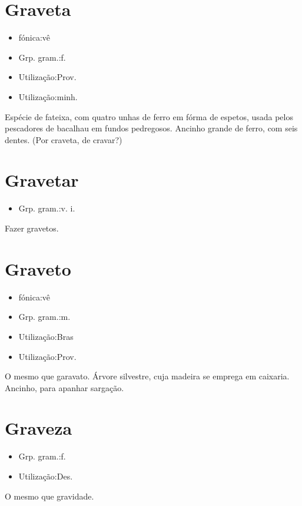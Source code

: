 \section{Graveta}
\begin{itemize}
\item {fónica:vê}
\end{itemize}
\begin{itemize}
\item {Grp. gram.:f.}
\end{itemize}
\begin{itemize}
\item {Utilização:Prov.}
\end{itemize}
\begin{itemize}
\item {Utilização:minh.}
\end{itemize}
Espécie de fateixa, com quatro unhas de ferro em fórma de espetos, usada pelos pescadores de bacalhau em fundos pedregosos.
Ancinho grande de ferro, com seis dentes.
(Por \textunderscore craveta\textunderscore , de \textunderscore cravar\textunderscore ?)
\section{Gravetar}
\begin{itemize}
\item {Grp. gram.:v. i.}
\end{itemize}
Fazer gravetos.
\section{Graveto}
\begin{itemize}
\item {fónica:vê}
\end{itemize}
\begin{itemize}
\item {Grp. gram.:m.}
\end{itemize}
\begin{itemize}
\item {Utilização:Bras}
\end{itemize}
\begin{itemize}
\item {Utilização:Prov.}
\end{itemize}
O mesmo que \textunderscore garavato\textunderscore .
Árvore silvestre, cuja madeira se emprega em caixaria.
Ancinho, para apanhar sargação.
\section{Graveza}
\begin{itemize}
\item {Grp. gram.:f.}
\end{itemize}
\begin{itemize}
\item {Utilização:Des.}
\end{itemize}
O mesmo que \textunderscore gravidade\textunderscore .
